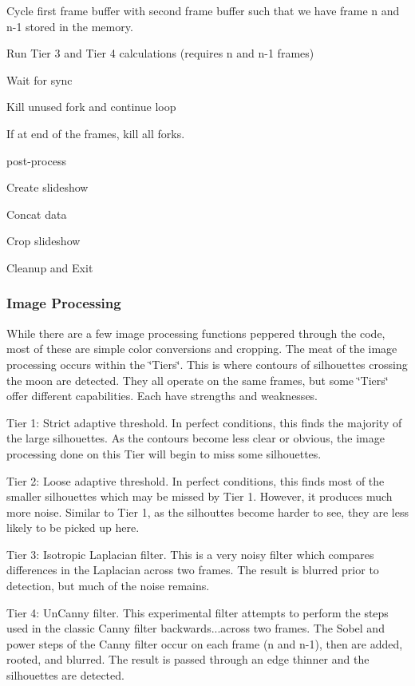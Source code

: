 \begin{DoxyItemize}
\begin{DoxyItemize}
\begin{DoxyItemize}
\item Cycle first frame buffer with second frame buffer such that we have frame n and n-\/1 stored in the memory.
\item Run Tier 3 and Tier 4 calculations (requires n and n-\/1 frames)
\item Wait for sync
\end{DoxyItemize}
\end{DoxyItemize}
\item Kill unused fork and continue loop
\item If at end of the frames, kill all forks.
\item post-\/process
\begin{DoxyItemize}
\item Create slideshow
\item Concat data
\item Crop slideshow
\end{DoxyItemize}
\item Cleanup and Exit
\end{DoxyItemize}

\subsubsection*{Image Processing}

While there are a few image processing functions peppered through the code, most of these are simple color conversions and cropping. The meat of the image processing occurs within the \char`\"{}\+Tiers\char`\"{}. This is where contours of silhouettes crossing the moon are detected. They all operate on the same frames, but some \char`\"{}\+Tiers\char`\"{} offer different capabilities. Each have strengths and weaknesses.


\begin{DoxyItemize}
\item Tier 1\+: Strict adaptive threshold. In perfect conditions, this finds the majority of the large silhouettes. As the contours become less clear or obvious, the image processing done on this Tier will begin to miss some silhouettes.
\item Tier 2\+: Loose adaptive threshold. In perfect conditions, this finds most of the smaller silhouettes which may be missed by Tier 1. However, it produces much more noise. Similar to Tier 1, as the silhouttes become harder to see, they are less likely to be picked up here.
\item Tier 3\+: Isotropic Laplacian filter. This is a very noisy filter which compares differences in the Laplacian across two frames. The result is blurred prior to detection, but much of the noise remains.
\item Tier 4\+: Un\+Canny filter. This experimental filter attempts to perform the steps used in the classic Canny filter backwards...across two frames. The Sobel and power steps of the Canny filter occur on each frame (n and n-\/1), then are added, rooted, and blurred. The result is passed through an edge thinner and the silhouettes are detected.
\end{DoxyItemize}

